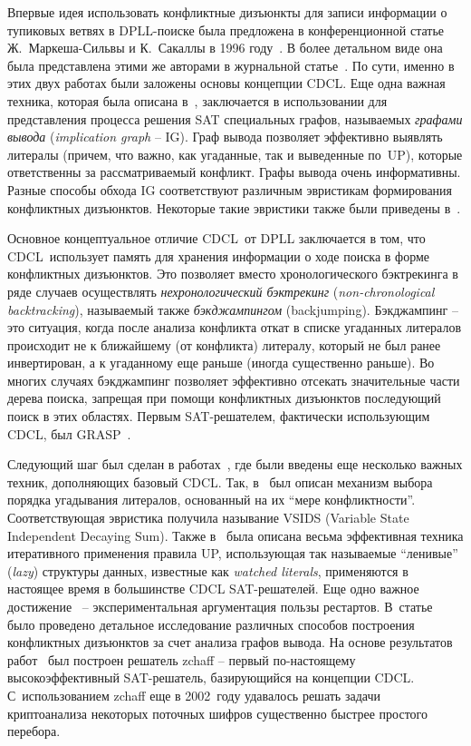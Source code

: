 Впервые идея использовать конфликтные дизъюнкты для записи информации о тупиковых ветвях в DPLL-поиске была предложена в конференционной статье Ж.~Маркеша-Сильвы и К.~Сакаллы в 1996 году~\cite{grasp}.
В более детальном виде она была представлена этими же авторами в журнальной статье~\cite{marques-silva1999}.
По сути, именно в этих двух работах были заложены основы концепции CDCL.
Еще одна важная техника, которая была описана в~\cite{grasp,marques-silva1999}, заключается в использовании для представления процесса решения SAT специальных графов, называемых \textit{графами вывода} (\textit{implication graph} \--- IG).
Граф вывода позволяет эффективно выявлять литералы (причем, что важно, как угаданные, так и выведенные по~UP), которые ответственны за рассматриваемый конфликт.
Графы вывода очень информативны.
Разные способы обхода IG соответствуют различным эвристикам формирования конфликтных дизъюнктов. Некоторые такие эвристики также были приведены в~\cite{grasp,marques-silva1999}.

Основное концептуальное отличие CDCL~от DPLL заключается в том, что CDCL~использует память для хранения информации о ходе поиска в форме конфликтных дизъюнктов.
Это позволяет вместо хронологического бэктрекинга в ряде случаев осуществлять \textit{нехронологический бэктрекинг} (\textit{non-chronological backtracking}), называемый также \textit{бэкджампингом} (backjumping).
Бэкджампинг \--- это ситуация, когда после анализа конфликта откат в списке угаданных литералов происходит не к ближайшему (от конфликта) литералу, который не был ранее инвертирован, а к угаданному еще раньше (иногда существенно раньше).
Во многих случаях бэкджампинг позволяет эффективно отсекать значительные части дерева поиска, запрещая при помощи конфликтных дизъюнктов последующий поиск в этих областях.
Первым SAT-решателем, фактически использующим CDCL, был GRASP~\cite{grasp}.

Следующий шаг был сделан в работах~\cite{moskewicz2001,zhang2001}, где были введены еще несколько важных техник, дополняющих базовый CDCL.
Так, в~\cite{moskewicz2001} был описан механизм выбора порядка угадывания литералов, основанный на их \enquote{мере конфликтности}.
Соответствующая эвристика получила называние VSIDS (Variable State Independent Decaying Sum).
Также в~\cite{moskewicz2001} была описана весьма эффективная техника итеративного применения правила UP, использующая так называемые \enquote{ленивые} (\textit{lazy}) структуры данных, известные как \textit{watched literals}, применяются в настоящее время в большинстве CDCL SAT-решателей.
Еще одно важное достижение~\cite{moskewicz2001} \--- экспериментальная аргументация пользы рестартов.
В~статье~\cite{zhang2001} было проведено детальное исследование различных способов построения конфликтных дизъюнктов за счет анализа графов вывода.
На основе результатов работ~\cite{moskewicz2001,zhang2001} был построен решатель zchaff \--- первый по-настоящему высокоэффективный SAT-решатель, базирующийся на концепции CDCL.
С~использованием zchaff еще в 2002~году удавалось решать задачи криптоанализа некоторых поточных шифров существенно быстрее простого перебора.

